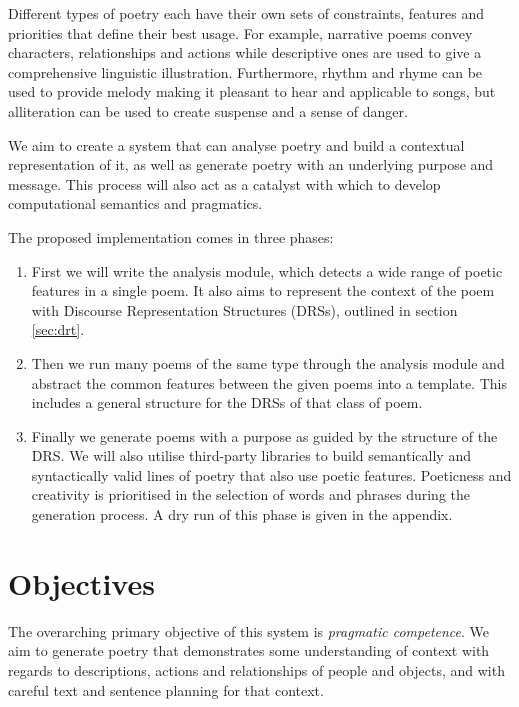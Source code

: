 Different types of poetry each have their own sets of constraints, features and priorities that define their best usage. For example, narrative poems convey characters, relationships and actions while descriptive ones are used to give a comprehensive linguistic illustration. Furthermore, rhythm and rhyme can be used to provide melody making it pleasant to hear and applicable to songs, but alliteration can be used to create suspense and a sense of danger.

We aim to create a system that can analyse poetry and build a contextual representation of it, as well as generate poetry with an underlying purpose and message. This process will also act as a catalyst with which to develop computational semantics and pragmatics.

The proposed implementation comes in three phases:
\begin{enumerate}
\item{First we will write the analysis module, which detects a wide range of poetic features in a single poem. It also aims to represent the context of the poem with Discourse Representation Structures (DRSs), outlined in section \ref{sec:drt}.}

\item{Then we run many poems of the same type through the analysis module and abstract the common features between the given poems into a template. This includes a general structure for the DRSs of that class of poem.}

\item{Finally we generate poems with a purpose as guided by the structure of the DRS. We will also utilise third-party libraries to build semantically and syntactically valid lines of poetry that also use poetic features. Poeticness and creativity is prioritised in the selection of words and phrases during the generation process. A dry run of this phase is given in the appendix.}
\end{enumerate}




\section{Objectives}
The overarching primary objective of this system is \textit{pragmatic competence}. We aim to generate poetry that demonstrates some understanding of context with regards to descriptions, actions and relationships of people and objects, and with careful text and sentence planning for that context.

